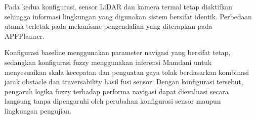 Pada kedua konfigurasi, sensor LiDAR dan kamera termal tetap diaktifkan sehingga informasi lingkungan yang digunakan sistem bersifat identik. Perbedaan utama terletak pada mekanisme pengendalian yang diterapkan pada APFPlanner.

Konfigurasi baseline menggunakan parameter navigasi yang bersifat tetap, sedangkan konfigurasi fuzzy menggunakan inferensi Mamdani untuk menyesuaikan skala kecepatan dan penguatan gaya tolak berdasarkan kombinasi jarak obstacle dan traversability hasil fusi sensor. Dengan konfigurasi tersebut, pengaruh logika fuzzy terhadap performa navigasi dapat dievaluasi secara langsung tanpa dipengaruhi oleh perubahan konfigurasi sensor maupun lingkungan pengujian.

